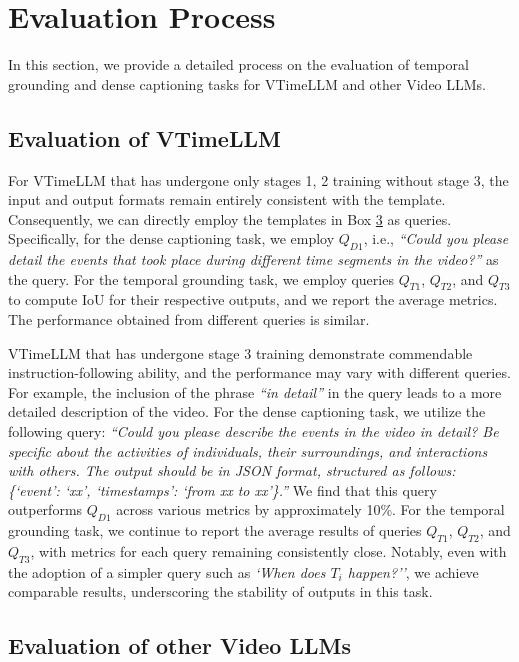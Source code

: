 \documentclass[10pt,twocolumn,letterpaper]{article}
\begin{document}
\section{Evaluation Process}

In this section, we provide a detailed process on the evaluation of temporal grounding and dense captioning tasks for VTimeLLM and other Video LLMs.

\subsection{Evaluation of VTimeLLM}


For VTimeLLM that has undergone only stages 1, 2 training without stage 3, the input and output formats remain entirely consistent with the template. Consequently, we can directly employ the templates in Box \hyperlink{box3}{3} as queries. Specifically, for the dense captioning task, we employ $Q_{D1}$, i.e., \textit{``Could you please detail the events that took place during different time segments in the video?''} as the query. For the temporal grounding task, we employ queries $Q_{T1}$, $Q_{T2}$, and $Q_{T3}$ to compute IoU for their respective outputs, and we report the average metrics. The performance obtained from different queries is similar.

VTimeLLM that has undergone stage 3 training demonstrate commendable instruction-following ability, and the performance may vary with different queries. For example, the inclusion of the phrase \textit{``in detail''} in the query leads to a more detailed description of the video. For the dense captioning task, we utilize the following query: \textit{``Could you please describe the events in the video in detail? Be specific about the activities of individuals, their surroundings, and interactions with others. The output should be in JSON format, structured as follows: \{`event': `xx', `timestamps': `from xx to xx'\}.''} We find that this query outperforms $Q_{D1}$ across various metrics by approximately 10\%. For the temporal grounding task, we continue to report the average results of queries $Q_{T1}$, $Q_{T2}$, and $Q_{T3}$, with metrics for each query remaining consistently close. Notably, even with the adoption of a simpler query such as \textit{`When does $T_i$ happen?''}, we achieve comparable results, underscoring the stability of outputs in this task.

\subsection{Evaluation of other Video LLMs}
\end{document}
